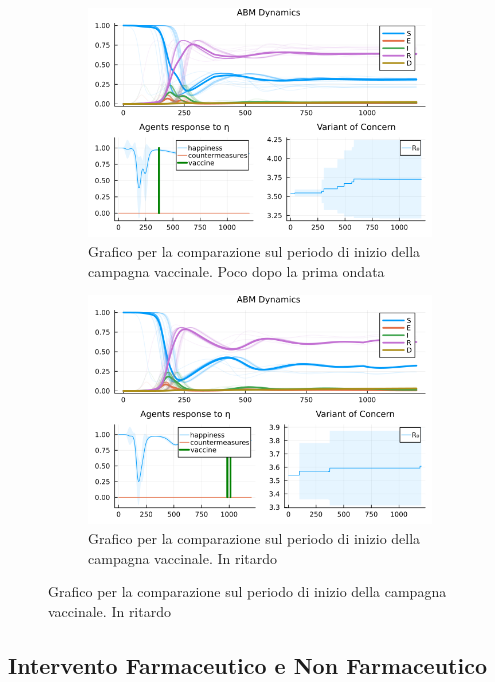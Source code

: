 \begin{figure}[H]
\begin{subfigure}[b]{0.45\textwidth}
		\label{fig:comparison_vax_2}
	\end{subfigure}
	\hfill
	\begin{subfigure}[b]{0.45\textwidth}
		\centering
		\includegraphics[width=\textwidth]{img/SocialNetworkABM_3_V.png}
		\caption{Grafico per la comparazione sul periodo di inizio della campagna vaccinale. Poco dopo la prima ondata}
		\label{fig:comparison_vax_3}
	\end{subfigure}
	\hfill
	\begin{subfigure}[b]{0.45\textwidth}
		\centering
		\includegraphics[width=\textwidth]{img/SocialNetworkABM_5_V.png}
		\caption{Grafico per la comparazione sul periodo di inizio della campagna vaccinale. In ritardo}
		\label{fig:comparison_vax_4}
	\end{subfigure}
\end{figure}

\subsection{Intervento Farmaceutico e Non Farmaceutico}

